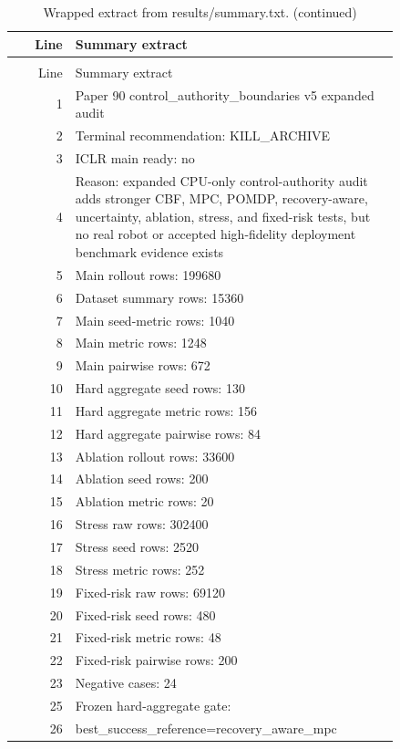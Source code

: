 \documentclass{article}
\begin{document}
\begin{center}
\tiny
\begin{longtable}{rp{0.84\linewidth}}
\caption{Wrapped extract from results/summary.txt.}\label{tab:summaryextract}\\
\toprule
Line & Summary extract\\
\midrule
\endfirsthead
\caption[]{Wrapped extract from results/summary.txt. (continued)}\\
\toprule
Line & Summary extract\\
\midrule
\endhead
1 & Paper 90 control\_authority\_boundaries v5 expanded audit\\
2 & Terminal recommendation: KILL\_ARCHIVE\\
3 & ICLR main ready: no\\
4 & Reason: expanded CPU-only control-authority audit adds stronger CBF, MPC, POMDP, recovery-aware, uncertainty, ablation, stress, and fixed-risk tests, but no real robot or accepted high-fidelity deployment benchmark evidence exists\\
5 & Main rollout rows: 199680\\
6 & Dataset summary rows: 15360\\
7 & Main seed-metric rows: 1040\\
8 & Main metric rows: 1248\\
9 & Main pairwise rows: 672\\
10 & Hard aggregate seed rows: 130\\
11 & Hard aggregate metric rows: 156\\
12 & Hard aggregate pairwise rows: 84\\
13 & Ablation rollout rows: 33600\\
14 & Ablation seed rows: 200\\
15 & Ablation metric rows: 20\\
16 & Stress raw rows: 302400\\
17 & Stress seed rows: 2520\\
18 & Stress metric rows: 252\\
19 & Fixed-risk raw rows: 69120\\
20 & Fixed-risk seed rows: 480\\
21 & Fixed-risk metric rows: 48\\
22 & Fixed-risk pairwise rows: 200\\
23 & Negative cases: 24\\
25 & Frozen hard-aggregate gate:\\
26 & best\_success\_reference=recovery\_aware\_mpc\\

\end{longtable}
\end{center}
\end{document}
